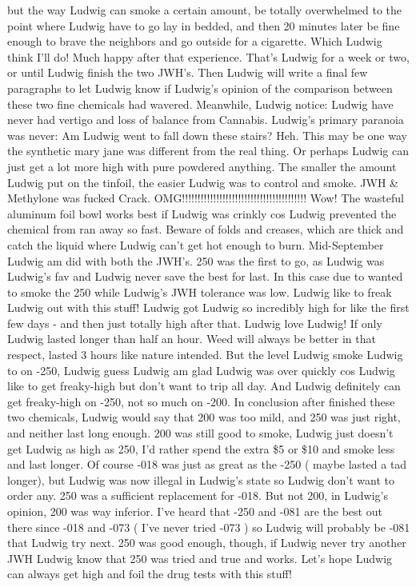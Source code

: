 \documentclass[12pt]{book}
\begin{document}
but the way Ludwig can smoke a certain amount, be totally overwhelmed to the point where Ludwig have to go lay in bedded, and then 20 minutes later be fine enough to brave the neighbors and go outside for a cigarette. Which Ludwig think I'll do! Much happy after that experience. That's Ludwig for a week or two, or until Ludwig finish the two JWH's. Then Ludwig will write a final few paragraphs to let Ludwig know if Ludwig's opinion of the comparison between these two fine chemicals had wavered. Meanwhile, Ludwig notice: Ludwig have never had vertigo and loss of balance from Cannabis. Ludwig's primary paranoia was never: Am Ludwig went to fall down these stairs? Heh. This may be one way the synthetic mary jane was different from the real thing. Or perhaps Ludwig can just get a lot more high with pure powdered anything. The smaller the amount Ludwig put on the tinfoil, the easier Ludwig was to control and smoke. JWH \& Methylone was fucked Crack. OMG!!!!!!!!!!!!!!!!!!!!!!!!!!!!!!!!!!!!!!!! Wow! The wasteful aluminum foil bowl works best if Ludwig was crinkly cos Ludwig prevented the chemical from ran away so fast. Beware of folds and creases, which are thick and catch the liquid where Ludwig can't get hot enough to burn. Mid-September Ludwig am did with both the JWH's. 250 was the first to go, as Ludwig was Ludwig's fav and Ludwig never save the best for last. In this case due to wanted to smoke the 250 while Ludwig's JWH tolerance was low. Ludwig like to freak Ludwig out with this stuff! Ludwig got Ludwig so incredibly high for like the first few days - and then just totally high after that. Ludwig love Ludwig! If only Ludwig lasted longer than half an hour. Weed will always be better in that respect, lasted 3 hours like nature intended. But the level Ludwig smoke Ludwig to on -250, Ludwig guess Ludwig am glad Ludwig was over quickly cos Ludwig like to get freaky-high but don't want to trip all day. And Ludwig definitely can get freaky-high on -250, not so much on -200. In conclusion after finished these two chemicals, Ludwig would say that 200 was too mild, and 250 was just right, and neither last long enough. 200 was still good to smoke, Ludwig just doesn't get Ludwig as high as 250, I'd rather spend the extra \$5 or \$10 and smoke less and last longer. Of course -018 was just as great as the -250 ( maybe lasted a tad longer), but Ludwig was now illegal in Ludwig's state so Ludwig don't want to order any. 250 was a sufficient replacement for -018. But not 200, in Ludwig's opinion, 200 was way inferior. I've heard that -250 and -081 are the best out there since -018 and -073 ( I've never tried -073 ) so Ludwig will probably be -081 that Ludwig try next. 250 was good enough, though, if Ludwig never try another JWH Ludwig know that 250 was tried and true and works. Let's hope Ludwig can always get high and foil the drug tests with this stuff!
\end{document}
